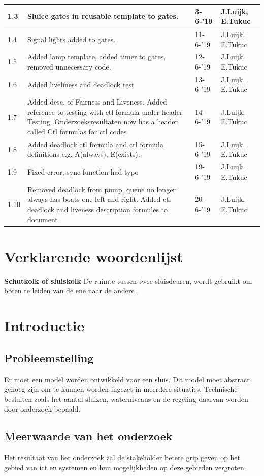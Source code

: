 \documentclass{article}
\begin{document}
\begin{table}[htp]
\begin{tabular}{|l|p{2.5in}|l|l|}
\hline
1.3 & Sluice gates in reusable template to gates. & 3-6-'19 & J.Luijk, E.Tukuc \\ 
\hline
1.4 & Signal lights added to gates. & 11-6-'19 & J.Luijk, E.Tukuc \\ 
\hline
1.5 & Added lamp template, added timer to gates, removed unnecessary code. & 12-6-'19 & J.Luijk, E.Tukuc \\ 
\hline
1.6 & Added liveliness and deadlock test & 13-6-'19 & J.Luijk, E.Tukuc \\ 
\hline
1.7 & Added desc. of Fairness and Liveness. Added reference to testing with ctl formula under header Testing. Onderzoeksresultaten now has a header called Ctl formulas for ctl codes & 14-6-'19 & J.Luijk, E.Tukuc \\ 
\hline
1.8 & Added deadlock ctl formula and ctl formula definitions e.g. A(always), E(exists). & 15-6-'19 & J.Luijk, E.Tukuc \\ 
\hline
1.9 & Fixed error, sync function had typo & 19-6-'19 & J.Luijk, E.Tukuc \\ 
\hline
1.10 & Removed deadlock from pump, queue no longer always has boats one left and right. Added ctl deadlock and liveness description formules to document & 20-6-'19 & J.Luijk, E.Tukuc \\ 
\hline
\end{tabular}
\end{table}
\newpage

\section{Verklarende woordenlijst}
\textbf{Schutkolk of sluiskolk} \newline
De ruimte tussen twee sluisdeuren, wordt gebruikt om boten te leiden van de ene naar de andere \cite{definitionschutkolk}.
\newpage
\section{Introductie}
\subsection{Probleemstelling}
Er moet een model worden ontwikkeld voor een sluis. Dit model moet abstract genoeg zijn om te kunnen worden ingezet in meerdere situaties. Technische besluiten zoals het aantal sluizen, waterniveaus en de regeling daarvan worden door onderzoek bepaald.

\subsection{Meerwaarde van het onderzoek}
Het resultaat van het onderzoek zal de stakeholder betere grip geven op het gebied van ict en systemen en hun mogelijkheden op deze gebieden vergroten. 
\end{document}
